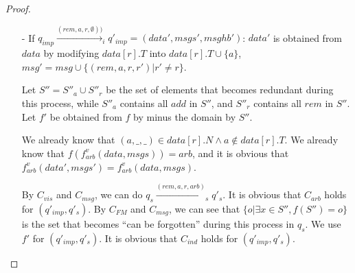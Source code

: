 \begin {proof}
\begin{itemize}
    It is easy to see that from the perspective of replica $r$ of implementation, $(a,t,p)$ is at the $\mathit{pos}$-th position. %
    It is easy to see that $a$ is previously not in $\mathit{data} \cup \mathit{msg}$, and therefore, $a$ is not in $q_s$. By $C_{\mathit{msg}}$ and $C_{\mathit{vis}}$, we can do $q_s \xrightarrow{( \mathit{add},a,\mathit{pos},r,\mathit{arb}' )}_i q'_s$ and let $o$ be the newly generated operations in $q'_s$, where $\mathit{arb}'$ is chosen to be $f_{\mathit{arb}}^v(\mathit{data}',\mathit{msgs}')$.

    It is obvious that no operation become redundant during this process. Let $f' = f \cup \{ ((a,id),,o) \}$. We use $f'$ for $(q'_{\mathit{imp}},q'_s)$. Similarly $C_{\mathit{mhb}}$ holds for $(q'_{\mathit{imp}},q'_s)$. Since there is no remove in $\mathit{FstRem}$ for $o$, and a new $\mathit{add}$ does not influence $\mathit{FstRem}$ for other operations, we have $C_{\mathit{FM}}$ holds for $(q'_{\mathit{imp}},q'_s)$. Since $p$ is in $\mathit{data}[r].N$ or $p = \circ$, $C_{\mathit{rely}}$ holds for $(q'_{\mathit{imp}},q'_s)$. It is easy to see that other condition also hold. Therefore, $(q'_{\mathit{imp}},q'_s) \in R_{\mathit{list}}$.

\item[-] If $q_{\mathit{imp}} \xrightarrow{( \mathit{rem},a,r,\emptyset ))}_i q'_{\mathit{imp}} = (\mathit{data}',\mathit{msgs}',\mathit{msghb}')$: $\mathit{data}'$ is obtained from $\mathit{data}$ by modifying $\mathit{data}[r].T$ into $\mathit{data}[r].T \cup \{ a \}$, $\mathit{msg}' = \mathit{msg} \cup \{ (\mathit{rem},a,r,r') \vert r' \neq r \}$.

    Let $S'' = S''_a \cup S''_r$ be the set of elements that becomes redundant during this process, while $S''_a$ contains all $\mathit{add}$ in $S''$, and $S''_r$ contains all $\mathit{rem}$ in $S''$. Let $f'$ be obtained from $f$ by minus the domain by $S''$.

    We already know that $(a,\_,\_) \in \mathit{data}[r].N \wedge a \notin \mathit{data}[r].T$. We already know that $f( f_{\mathit{arb}}^v(\mathit{data},\mathit{msgs}) ) = \mathit{arb}$, and it is obvious that $f_{\mathit{arb}}^v(\mathit{data}',\mathit{msgs}') = f_{\mathit{arb}}^v(\mathit{data},\mathit{msgs})$.

    By $C_{\mathit{vis}}$ and $C_{\mathit{msg}}$, we can do $q_s \xrightarrow{( \mathit{rem},a,r,\mathit{arb} )}_s q'_s$. It is obvious that $C_{\mathit{arb}}$ holds for $(q'_{\mathit{imp}},q'_s)$. By $C_{\mathit{FM}}$ and $C_{\mathit{msg}}$, we can see that $\{ o \vert \exists x \in S'', f(S'') = o \}$ is the set that becomes ``can be forgotten'' during this process in $q_s$. We use $f'$ for $(q'_{\mathit{imp}},q'_s)$. It is obvious that $C_{\mathit{ind}}$ holds for $(q'_{\mathit{imp}},q'_s)$.


\end{itemize}
\end{proof}
